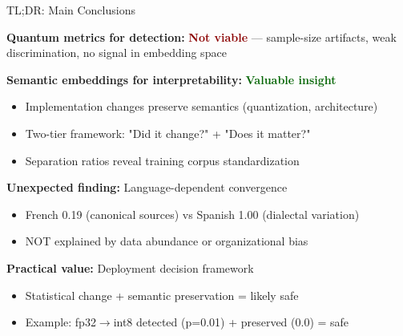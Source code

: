 \documentclass[aspectratio=169,11pt]{beamer}
\begin{document}
\begin{frame}{TL;DR: Main Conclusions}

\textbf{Quantum metrics for detection:} \textcolor{darkred}{\textbf{Not viable}} — sample-size artifacts, weak discrimination, no signal in embedding space

\vspace{0.3em}

\textbf{Semantic embeddings for interpretability:} \textcolor{darkgreen}{\textbf{Valuable insight}}
\begin{itemize}
  \item Implementation changes preserve semantics (quantization, architecture)
  \item Two-tier framework: "Did it change?" + "Does it matter?"
  \item Separation ratios reveal training corpus standardization
\end{itemize}

\vspace{0.3em}

\textbf{Unexpected finding:} Language-dependent convergence
\begin{itemize}
  \item French 0.19 (canonical sources) vs Spanish 1.00 (dialectal variation)
  \item NOT explained by data abundance or organizational bias
\end{itemize}

\vspace{0.3em}

\textbf{Practical value:} Deployment decision framework
\begin{itemize}
  \item Statistical change + semantic preservation = likely safe
  \item Example: fp32$\to$int8 detected (p=0.01) + preserved (0.0) = safe
\end{itemize}

\end{frame}
\end{document}
